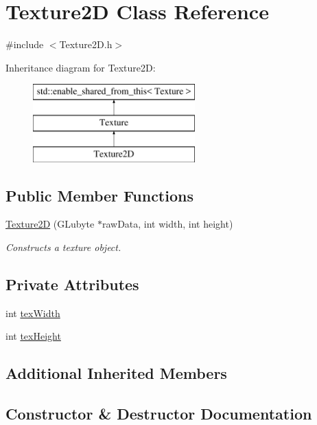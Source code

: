 \hypertarget{class_texture2_d}{}\section{Texture2D Class Reference}
\label{class_texture2_d}


{\ttfamily \#include $<$Texture2\+D.\+h$>$}

Inheritance diagram for Texture2D\+:\begin{figure}[H]
\begin{center}
\leavevmode
\includegraphics[height=3.000000cm]{class_texture2_d}
\end{center}
\end{figure}
\subsection*{Public Member Functions}
\begin{DoxyCompactItemize}
\item 
\hyperlink{class_texture2_d_ad033510acef475ce46df4eda3d388546}{Texture2D} (G\+Lubyte $\ast$raw\+Data, int width, int height)
\begin{DoxyCompactList}\small\item\em Constructs a texture object. \end{DoxyCompactList}\end{DoxyCompactItemize}
\subsection*{Private Attributes}
\begin{DoxyCompactItemize}
\item 
int \hyperlink{class_texture2_d_adf75753ea19d57141c9da0ff3298a20d}{tex\+Width}
\item 
int \hyperlink{class_texture2_d_ae7a111c14c36358906cebf47e94541e2}{tex\+Height}
\end{DoxyCompactItemize}
\subsection*{Additional Inherited Members}


\subsection{Constructor \& Destructor Documentation}
\hypertarget{class_texture2_d_ad033510acef475ce46df4eda3d388546}{}\label{class_texture2_d_ad033510acef475ce46df4eda3d388546} 
